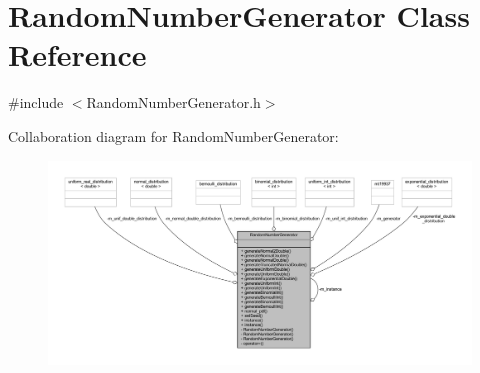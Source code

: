 \hypertarget{class_random_number_generator}{}\section{Random\+Number\+Generator Class Reference}
\label{class_random_number_generator}


{\ttfamily \#include $<$Random\+Number\+Generator.\+h$>$}



Collaboration diagram for Random\+Number\+Generator\+:\nopagebreak
\begin{figure}[H]
\begin{center}
\leavevmode
\includegraphics[width=350pt]{class_random_number_generator__coll__graph}
\end{center}
\end{figure}
